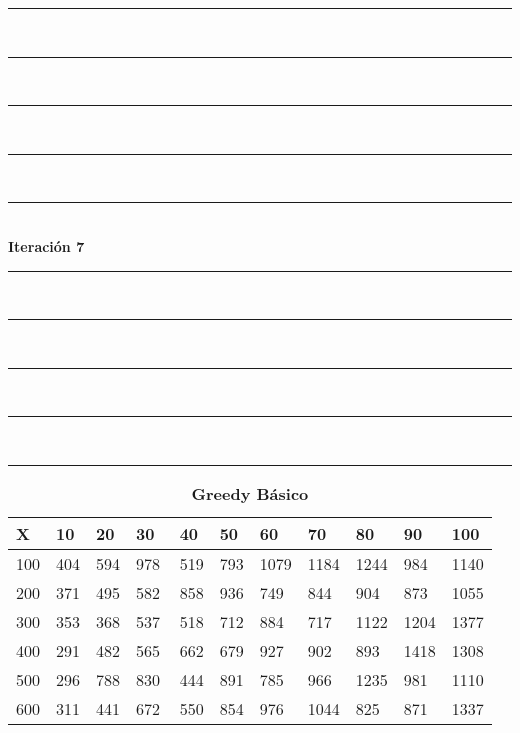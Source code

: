 \documentclass[10pt,letterpaper]{article}
\begin{document}
\newpage 
\begin{center}
\newcommand{\HRule}{\rule{\linewidth}{0.5mm}}
\center
\HRule\\[6cm]
\HRule\\[0.4cm]
\HRule\\[0.4cm]
\HRule\\[0.4cm]
\HRule\\[0.4cm]
{\centering \Huge\bfseries Iteración 7}\\[0.4cm]
\HRule\\[0.4cm]
\HRule\\[0.4cm]
\HRule\\[0.4cm]
\HRule\\[6cm]
\HRule
\end{center}
\newpage 
{}
\begin{center}
\begin{table}\renewcommand{\arraystretch}{2.5}
\caption{\large \textbf{Greedy Básico}}
\centering
\begin{tabular} { |m{0.5cm}|m{1.3cm}|m{1.3cm}|m{1.3cm}|m{1.3cm}|m{1.3cm}|m{1.3cm}|m{1.3cm}|m{1.3cm}|m{1.3cm}|m{1.3cm}|} 
\hline
\rowcolor{Gray}
\centering \textbf{X} & \centering \textbf{10} & \centering \textbf{20} & \centering \textbf{30}\ & \centering \textbf{40} & \centering \textbf{50} & \centering \textbf{60}\ & \centering \textbf{70} & \centering \textbf{80} & \centering \textbf{90}\ & \textbf{100} \\\hline
\cellcolor{Gray}100 & \Large 404 & \Large 594 & \Large 978 & \Large 519 & \Large 793 & \Large 1079 & \Large 1184 & \Large 1244 & \Large 984 & \Large 1140 \\
\hline
\cellcolor{Gray}200 & \Large 371 & \Large 495 & \Large 582 & \Large 858 & \Large 936 & \Large 749 & \Large 844 & \Large 904 & \Large 873 & \Large 1055 \\
\hline
\cellcolor{Gray}300 & \Large 353 & \Large 368 & \Large 537 & \Large 518 & \Large 712 & \Large 884 & \Large 717 & \Large 1122 & \Large 1204 & \Large 1377 \\
\hline
\cellcolor{Gray}400 & \Large 291 & \Large 482 & \Large 565 & \Large 662 & \Large 679 & \Large 927 & \Large 902 & \Large 893 & \Large 1418 & \Large 1308 \\
\hline
\cellcolor{Gray}500 & \Large 296 & \Large 788 & \Large 830 & \Large 444 & \Large 891 & \Large 785 & \Large 966 & \Large 1235 & \Large 981 & \Large 1110 \\
\hline
\cellcolor{Gray}600 & \Large 311 & \Large 441 & \Large 672 & \Large 550 & \Large 854 & \Large 976 & \Large 1044 & \Large 825 & \Large 871 & \Large 1337 \\

\end{tabular}
\end{table}
\end{center}
\end{document}
